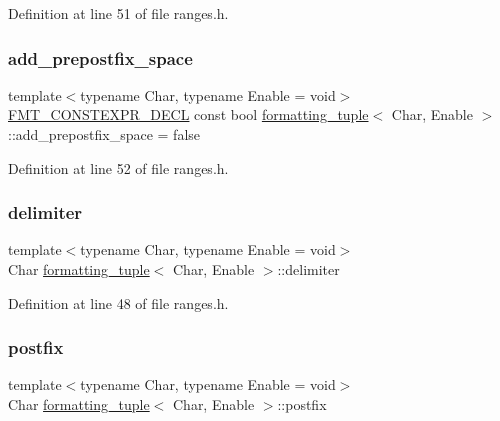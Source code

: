 Definition at line 51 of file ranges.\+h.

\mbox{\label{structformatting__tuple_a607427f209e091fc99bf81648ae1e882}} 
\subsubsection{\texorpdfstring{add\+\_\+prepostfix\+\_\+space}{add\_prepostfix\_space}}
{\footnotesize\ttfamily template$<$typename Char, typename Enable = void$>$ \\
\hyperlink{core_8h_af4388801466a5994a363d6005616371a}{F\+M\+T\+\_\+\+C\+O\+N\+S\+T\+E\+X\+P\+R\+\_\+\+D\+E\+CL} const bool \hyperlink{structformatting__tuple}{formatting\+\_\+tuple}$<$ Char, Enable $>$\+::add\+\_\+prepostfix\+\_\+space = false\hspace{0.3cm}{\ttfamily [static]}}



Definition at line 52 of file ranges.\+h.

\mbox{\label{structformatting__tuple_a41a084f3a72cc6bfa848e57dff30b4ed}} 
\subsubsection{\texorpdfstring{delimiter}{delimiter}}
{\footnotesize\ttfamily template$<$typename Char, typename Enable = void$>$ \\
Char \hyperlink{structformatting__tuple}{formatting\+\_\+tuple}$<$ Char, Enable $>$\+::delimiter}



Definition at line 48 of file ranges.\+h.

\mbox{\label{structformatting__tuple_a7e5bf94913811fbd2b551e38c88146d6}} 
\subsubsection{\texorpdfstring{postfix}{postfix}}
{\footnotesize\ttfamily template$<$typename Char, typename Enable = void$>$ \\
Char \hyperlink{structformatting__tuple}{formatting\+\_\+tuple}$<$ Char, Enable $>$\+::postfix}



